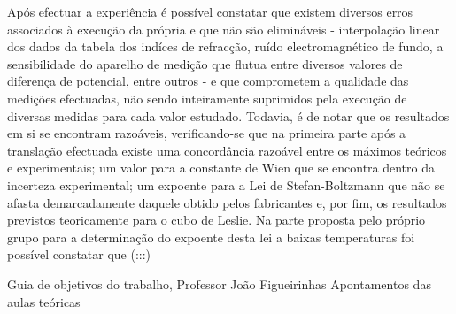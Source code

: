 \documentclass[9pt]{extarticle}
\begin{document}
\begin{multicols}{2}
\par Após efectuar a experiência é possível constatar que existem diversos erros associados à execução da própria e que não são elimináveis - interpolação linear dos dados da tabela dos indíces de refracção, ruído electromagnético de fundo, a sensibilidade do aparelho de medição que flutua entre diversos valores de diferença de potencial, entre outros - e que comprometem a qualidade das medições efectuadas, não sendo inteiramente suprimidos pela execução de diversas medidas para cada valor estudado. Todavia, é de notar que os resultados em si se encontram razoáveis, verificando-se que na primeira parte após a translação efectuada existe uma concordância razoável entre os máximos teóricos e experimentais; um valor para a constante de Wien que se encontra dentro da incerteza experimental; um expoente para a Lei de Stefan-Boltzmann que não se afasta demarcadamente daquele obtido pelos fabricantes e, por fim, os resultados previstos teoricamente para o cubo de Leslie. Na parte proposta pelo próprio grupo para a determinação do expoente desta lei a baixas temperaturas foi possível constatar que (:::)

\begin{thebibliography}{9}

 Guia de objetivos do trabalho, Professor João Figueirinhas
 Apontamentos das aulas teóricas
\end{thebibliography}

\vfill

\pagebreak

%

\end{multicols}
\end{document}
